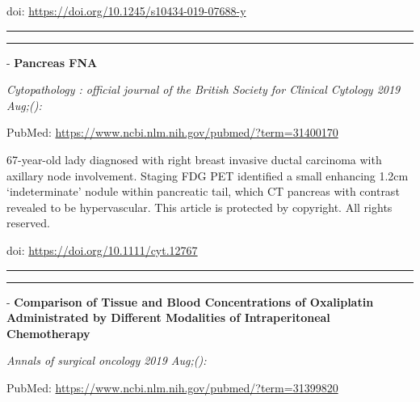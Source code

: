 \documentclass[]{article}
\begin{document}
doi: \url{https://doi.org/10.1245/s10434-019-07688-y}

{}

{}

\begin{center}\rule{0.5\linewidth}{\linethickness}\end{center}

\begin{center}\rule{0.5\linewidth}{\linethickness}\end{center}

 - \textbf{Pancreas FNA}

\emph{Cytopathology : official journal of the British Society for
Clinical Cytology 2019 Aug;():}

PubMed: \url{https://www.ncbi.nlm.nih.gov/pubmed/?term=31400170}

67-year-old lady diagnosed with right breast invasive ductal carcinoma
with axillary node involvement. Staging FDG PET identified a small
enhancing 1.2cm `indeterminate' nodule within pancreatic tail, which CT
pancreas with contrast revealed to be hypervascular. This article is
protected by copyright. All rights reserved.

doi: \url{https://doi.org/10.1111/cyt.12767}

{}

{}

\begin{center}\rule{0.5\linewidth}{\linethickness}\end{center}

\begin{center}\rule{0.5\linewidth}{\linethickness}\end{center}

 - \textbf{Comparison of Tissue and Blood Concentrations of Oxaliplatin
Administrated by Different Modalities of Intraperitoneal Chemotherapy}

\emph{Annals of surgical oncology 2019 Aug;():}

PubMed: \url{https://www.ncbi.nlm.nih.gov/pubmed/?term=31399820}
\end{document}
